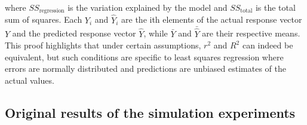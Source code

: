 where \(SS_{\text{regression}}\) is the variation explained by the model and \(SS_{\text{total}}\) is the total sum of squares. Each \(Y_i\) and \(\hat{Y}_i\) are the ith elements of the actual response vector \(Y\) and the predicted response vector \(\hat{Y}\), while \(\bar{Y}\) and \(\bar{\hat{Y}}\) are their respective means. This proof highlights that under certain assumptions, \( r^2 \) and \( R^2 \) can indeed be equivalent, but such conditions are specific to least squares regression where errors are normally distributed and predictions are unbiased estimates of the actual values.

\subsection*{Original results of the simulation experiments}

